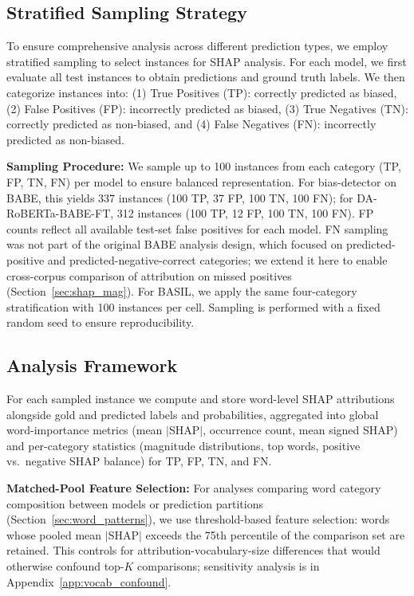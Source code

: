 \documentclass[11pt]{article}
\begin{document}
\subsection{Stratified Sampling Strategy} 
To ensure comprehensive analysis across different prediction types, we 
employ stratified sampling to select instances for SHAP analysis. For 
each model, we first evaluate all test instances to obtain predictions 
and ground truth labels. We then categorize instances into: (1) True 
Positives (TP): correctly predicted as biased, (2) False Positives 
(FP): incorrectly predicted as biased, (3) True Negatives (TN): 
correctly predicted as non-biased, and (4) False Negatives (FN): 
incorrectly predicted as non-biased.

\textbf{Sampling Procedure:} We sample up to 100 instances from each 
category (TP, FP, TN, FN) per model to ensure balanced representation. 
For bias-detector on BABE, this yields 337 instances (100 TP, 37 FP, 
100 TN, 100 FN); for DA-RoBERTa-BABE-FT, 312 instances (100 TP, 12 
FP, 100 TN, 100 FN). FP counts reflect all available test-set false 
positives for each model. FN sampling was not part of the original 
BABE analysis design, which focused on predicted-positive and 
predicted-negative-correct categories; we extend it here to enable 
cross-corpus comparison of attribution on missed positives 
(Section~\ref{sec:shap_mag}). For BASIL, we apply the same 
four-category stratification with 100 instances per cell. Sampling is 
performed with a fixed random seed to ensure reproducibility.



\subsection{Analysis Framework}
For each sampled instance we compute and store word-level SHAP 
attributions alongside gold and predicted labels and probabilities, 
aggregated into global word-importance metrics (mean $|$SHAP$|$, 
occurrence count, mean signed SHAP) and per-category statistics 
(magnitude distributions, top words, positive vs.\ negative SHAP 
balance) for TP, FP, TN, and FN.

\textbf{Matched-Pool Feature Selection:} For analyses comparing word 
category composition between models or prediction partitions 
(Section~\ref{sec:word_patterns}), we use threshold-based feature 
selection: words whose pooled mean $|$SHAP$|$ exceeds the 75th 
percentile of the comparison set are retained. This controls for 
attribution-vocabulary-size differences that would otherwise confound 
top-$K$ comparisons; sensitivity analysis is in 
Appendix~\ref{app:vocab_confound}.
\end{document}
